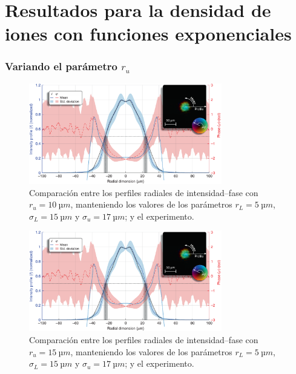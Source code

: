\chapter{Resultados para la densidad de iones con funciones exponenciales}\label{anx:3}
\subsection*{Variando el parámetro $r_{u}$}

\begin{figure}[htbp]
  \centering
  \includegraphics[width=0.75\textwidth]{Figuras/anx_cmp_81.png}
  \caption*{Comparación entre los perfiles radiales de intensidad--fase con $r_{u}=\qty{10}{µm}$, manteniendo los valores de los parámetros $r_{L}=\qty{5}{µm}$, $\sigma_{L}=\qty{15}{µm}$ y $\sigma_{u}=\qty{17}{µm}$; y el experimento.}
\end{figure}

\begin{figure}[htbp]
  \centering
  \includegraphics[width=0.75\textwidth]{Figuras/anx_cmp_82.png}
  \caption*{Comparación entre los perfiles radiales de intensidad--fase con $r_{u}=\qty{15}{µm}$, manteniendo los valores de los parámetros $r_{L}=\qty{5}{µm}$, $\sigma_{L}=\qty{15}{µm}$ y $\sigma_{u}=\qty{17}{µm}$; y el experimento.}
\end{figure}

\newpage

